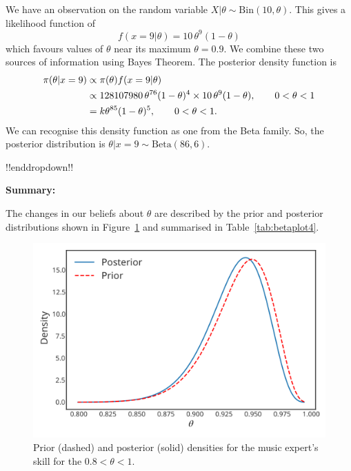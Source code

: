 {We have an observation on the random variable $X|\theta\sim
        \mathrm{Bin}(10,\theta)$. This gives a likelihood function of
        \begin{equation}
        f(x=9|\theta)=10\,\theta^9(1-\theta)
        \label{eq:p4}
        \end{equation}
        which favours values of $\theta$ near its maximum $\theta=0.9$. We combine these two sources of information using Bayes Theorem. The posterior density function is 
        \begin{align}
        \label{eq:p5}
        \pi(\theta|x=9)&\propto\pi(\theta)f(x=9|\theta) \notag \\
        &\propto 128107980\,\theta^{76}(1-\theta)^4\times 10\,\theta^9(1-\theta),
        \quad\quad 0<\theta<1 \notag \\
        &=k\theta^{85}(1-\theta)^5,\quad\quad 0<\theta<1.
        \end{align}
        We can recognise this density function as one from the Beta family. So, the posterior distribution is $\theta|x=9\sim
        \mathrm{Beta}(86,6)$.

!!enddropdown!!

\textbf{Summary:}

The changes in our beliefs about $\theta$ are described by the prior and posterior distributions shown in Figure~\ref{fig:betaplot4} and summarised in Table~\ref{tab:betaplot4}.
\begin{figure}[h!]

\includegraphics{images/priorposterior1.svg}
\caption{Prior (dashed) and posterior (solid) densities for the music expert's skill for the $0.8 < \theta < 1$.}
\label{fig:betaplot4}


\end{figure}}
